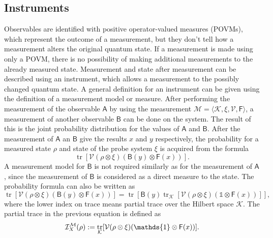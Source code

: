 \documentclass[a4paper,12pt]{wihuri}
\theoremstyle{definition}
\numberwithin{definition}{section}
\numberwithin{example}{section}
\numberwithin{theorem}{section}
\numberwithin{proposition}{section}
\numberwithin{lemma}{section}
\newcommand{\I}{\mathcal{I}}%
\newcommand{\ins}{\I_X^{\mm}}%
\newcommand{\ki}{\mathcal{K}}%
\newcommand{\mm}{\mathcal{M}}%
\newcommand{\V}{\mathcal{V}}%
\newcommand{\A}{\mathsf{A}}%
\newcommand{\B}{\mathsf{B}}%
\newcommand{\F}{\mathsf{F}}%
\newcommand{\id}{\mathds{1}}
\DeclareMathOperator{\tr}{tr}
\begin{document}
\subsection{Instruments}
Observables are identified with positive operator-valued measures (POVMs), which represent the outcome of a measurement, but they don't tell how a measurement alters the original quantum state. If a measurement is made using only a POVM, there is no possibility of making additional measurements to the already measured state. Measurement and state after measurement can be described using an instrument, which allows a measurement to the possibly changed quantum state.
A general definition for an instrument can be given using the definition of a measurement model or measure. After performing the measurement of the observable $\A$ by using the measurement $\mm = \langle \ki, \xi, \V, \F \rangle$, a measurement of another observable $\B$ can be done on the system. The result of this is the joint probability distribution for the values of $\A$ and $\B$. After the measurement of $\A$ an $\B$ give the results $x$ and $y$ respectively, the probability for a measured state $\rho$ and state of the probe system $\xi$ is acquired from the formula
\begin{equation}
\tr[\V(\rho \otimes \xi)(\B(y)\otimes \F(x))]\mathrm{.}
\end{equation}
A measurement model for $\B$ is not required similarly as for the measurement of $\A$, since the measurement of $\B$ is considered as a direct measure to the state. The probability formula can also be written as
\begin{equation*}
\tr[\V(\rho \otimes \xi)(\B(y)\otimes \F(x))] = \tr[\B(y)\tr_{\ki}[\V(\rho \otimes \xi)(\id \otimes \F(x))]],
\end{equation*}
where the lower index on trace means partial trace over the Hilbert space $\ki$. The partial trace in the previous equation is defined as 
\begin{equation}
\ins(\rho) := \tr_{\ki}[\V(\rho \otimes \xi)(\id \otimes \F(x))]\text.
\end{equation}
\end{document}
